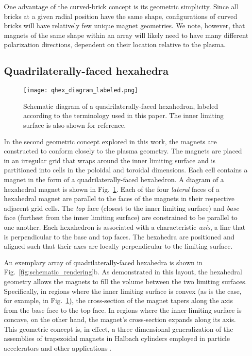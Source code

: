 \documentclass[11pt,onecolumn]{article}
\begin{document}
One advantage of the curved-brick concept is its geometric simplicity.
Since all bricks at a given radial position have the same shape, configurations
of curved bricks will have relatively few unique magnet geometries. 
We note, however, that 
magnets of the same shape within an array will likely need to have many
different polarization directions, dependent on their location relative to
the plasma. 

\subsection{Quadrilaterally-faced hexahedra}
\label{ssect:qhex}

\begin{figure}
    \begin{center}
    \texttt{[image: qhex\_diagram\_labeled.png]}
    \caption{Schematic diagram of a quadrilaterally-faced hexahedron, labeled
             according to the terminology used in this paper. The inner
             limiting surface is also shown for reference.}
    \label{fig:qhex_diagram}
    \end{center}
\end{figure}

In the second geometric concept explored in this work, the magnets are 
constructed to conform closely to the plasma geometry. The magnets are placed
in an irregular grid that wraps around the inner limiting
surface and is partitioned into cells in the poloidal and toroidal dimensions.
Each cell contains a magnet in the form of a quadrilaterally-faced hexahedron.
A diagram of a hexahedral magnet is shown in Fig.~\ref{fig:qhex_diagram}.
Each of the four \textit{lateral} faces of 
a hexahedral magnet are parallel to the faces of the magnets in their 
respective adjacent grid cells. The \textit{top} face (closest to the inner
limiting surface) and \textit{base} face (furthest from the inner limiting 
surface) are constrained to be parallel to
one another. Each hexahedron is associated with a characteristic \textit{axis},
a line that is perpendicular to the base and top faces. The hexahedra are
positioned and aligned such that their axes are locally perpendicular to the
limiting surface.

An exemplary array of quadrilaterally-faced hexahedra is shown in 
Fig.~\ref{fig:schematic_rendering}b. As demonstrated in this layout,
the hexahedral geometry allows the magnets to fill the
volume between the two limiting surfaces. Specifically, in regions where
the inner limiting surface is convex (as is the case, for example, in
Fig.~\ref{fig:qhex_diagram}), the cross-section of the magnet tapers along
the axis from the base face to the top face.
In regions where the inner limiting surface is concave, on the other hand, 
the magnet's cross-section expands along its axis.
This geometric concept is, in effect, a three-dimensional
generalization of the assemblies of trapezoidal magnets in Halbach cylinders
employed in particle accelerators and other applications \cite{halbach1980a}.
\end{document}
